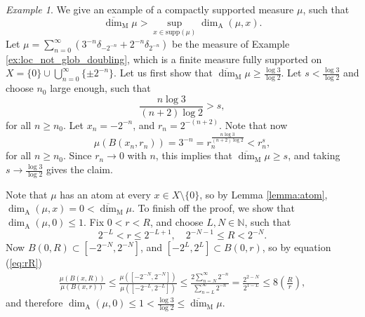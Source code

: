 \documentclass{PRM}
\newcommand{\field}[1]{\mathbb{#1}}
\newcommand{\N}{\field{N}}
\newcommand{\updim}{\overline{\dim}}
\theoremstyle{plain}
\theoremstyle{definition}
\theoremstyle{remark}
\newtheorem{example}[thm]{Example}
\begin{document}
\begin{example}
We give an example of a compactly supported measure $\mu$, such that
\begin{equation*}
    \updim_{\mathrm{M}}\mu>\sup_{x\in\mathrm{supp}(\mu)}\dim_{\mathrm{A}}(\mu,x).
\end{equation*}
Let $\mu=\sum_{n=0}^{\infty}(3^{-n}\delta_{-2^{-n}}+2^{-n}\delta_{2^{-n}})$ be the measure of Example \ref{ex:loc_not_glob_doubling}, which is a finite measure fully supported on $X=\{0\}\cup\bigcup_{n=0}^{\infty}\{\pm 2^{-n}\}$. Let us first show that $\updim_{\mathrm{M}}\mu\geq \frac{\log 3}{\log 2}$. Let $s<\frac{\log 3}{\log 2}$ and choose $n_0$ large enough, such that
\begin{equation*}
    \frac{n\log3}{(n+2)\log 2}> s,
\end{equation*}
for all $n\geq n_0$. Let $x_n=-2^{-n}$, and $r_n=2^{-(n+2)}$. Note that now
\begin{equation*}
    \mu(B(x_n,r_n))=3^{-n}=r_n^{\frac{n\log 3}{(n+2)\log 2}}< r_n^{s},
\end{equation*}
for all $n\geq n_0$. Since $r_n\to 0$ with $n$, this implies that $\updim_{\mathrm{M}}\mu\geq s$, and taking $s\to\frac{\log 3}{\log 2}$ gives the claim.

Note that $\mu$ has an atom at every $x\in X\setminus\{0\}$, so by Lemma \ref{lemma:atom}, $\dim_{\mathrm{A}}(\mu,x)=0<\updim_{\mathrm{M}}\mu$. To finish off the proof, we show that $\dim_{\mathrm{A}}(\mu,0)\leq1$. Fix $0<r<R$, and choose $L,N\in \N$, such that
\begin{equation}\label{eq:rR}
    2^{-L}< r \leq 2^{-L+1},\quad2^{-N-1}\leq R < 2^{-N}.
\end{equation}
Now $B(0,R)\subset [-2^{-N},2^{-N}]$, and $[-2^{L},2^{L}]\subset B(0,r)$, so by equation (\ref{eq:rR})
\begin{align*}
    \frac{\mu(B(x,R))}{\mu(B(x,r))}\leq \frac{\mu([-2^{-N},2^{-N}])}{\mu([-2^{-L},2^{-L}])}\leq\frac{2\sum_{n=N}^{\infty}2^{-n}}{\sum_{n=L}^{\infty}2^{-n}}=\frac{2^{2-N}}{2^{1-L}}\leq 8\left(\frac{R}{r}\right),
\end{align*}
and therefore $\dim_{\mathrm{A}}(\mu,0)\leq1<\frac{\log3}{\log 2}\leq \updim_{\mathrm{M}}\mu$.
\end{example}
\end{document}
